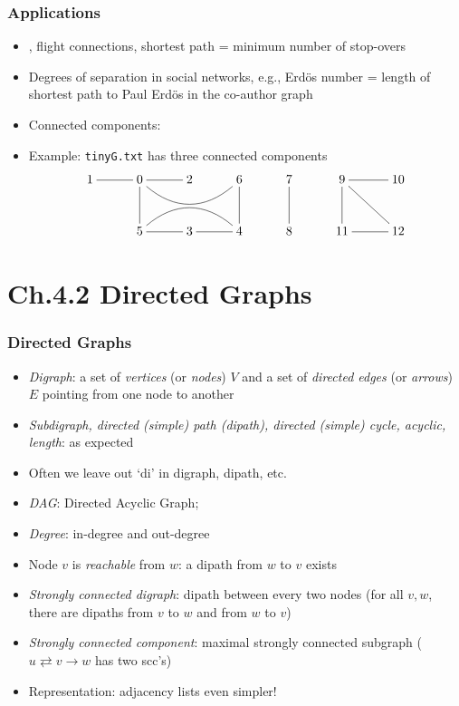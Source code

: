 \documentclass[handout]{beamer}
\newcommand{\git}{https://github.com/marcbezem/INF102/blob/master}
\begin{document}
\begin{frame}
    \frametitle{Applications}

\begin{itemize}[<+->]
\item \href{\git/programs/graphs/StringSTG.java}%
{\color{red}{StringSTG.java}}, flight connections, shortest path = minimum number of
stop-overs
\item Degrees of separation in social networks, e.g., 
Erd\"{o}s number = length of shortest path to Paul Erd\"{o}s in the co-author graph
\item Connected components:
\href{\git/programs/graphs/LinkedListG.java}%
{\color{red}{\tt LinkedListG.countcc()}} 
\item Example: {\tt tinyG.txt} has three connected components
\[
\xymatrix@R=1cm@C=1cm{
1 & 0\ar@{-}[l]\ar@{-}[d]\ar@{-}[r]\ar@{-}@(dr,dl)[rr] &2 & 6 & 
7 \ar@{-}[d]& 9 \ar@{-}[d]\ar@{-}[rd] \ar@{-}[r]& 10\\
   & 5 \ar@{-}@(ur,ul)[rr] \ar@{-}[r] & 3  \ar@{-}[r] & 4   \ar@{-}[u] & 
8                   &  11\ar@{-}[r] & 12 }
\]
\end{itemize}
\end{frame}


\section{Ch.4.2 Directed Graphs}

\begin{frame}
    \frametitle{Directed Graphs}

\begin{itemize}[<+->]
\item\emph{Digraph}: a set of \emph{vertices} (or \emph{nodes}) $V$
and a set of \emph{directed edges} (or \emph{arrows}) $E$ pointing from one node to another
\item\emph{Subdigraph, directed (simple) path (\emph{{\color{red}di}path}), 
directed (simple) cycle, acyclic, length}: as expected
\item Often we leave out `di' in digraph, dipath, etc.
\item\emph{DAG}: {\color{red}D}irected {\color{red}A}cyclic {\color{red}G}raph;
\item\emph{Degree}: {\color{red}in}-degree and {\color{red}out}-degree
\item Node $v$ is \emph{reachable} from $w$: a dipath  from $w$ to $v$ exists
\item\emph{Strongly connected digraph}: dipath between every two nodes (for all
$v,w$, there are dipaths from $v$ to $w$ and from $w$ to $v$)
\item\emph{Strongly connected component}: maximal strongly connected subgraph
($u\rightleftarrows v \to w$ has two scc's)
\item Representation: adjacency lists even simpler!
\end{itemize}
\end{frame}
\end{document}

